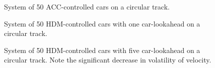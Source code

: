 \documentclass[12pt]{article}
\begin{document}
\begin{figure}[H]
  \centering
  \caption{System of 50 ACC-controlled cars on a circular track.}
\end{figure}

\begin{figure}[H]
  \centering
  \caption{System of 50 HDM-controlled cars with one car-lookahead on a circular track.}
\end{figure}

\begin{figure}[H]
  \centering
  \caption{System of 50 HDM-controlled cars with five car-lookahead on a circular track. Note the significant decrease in volatility of velocity.}
\end{figure}
\end{document}
